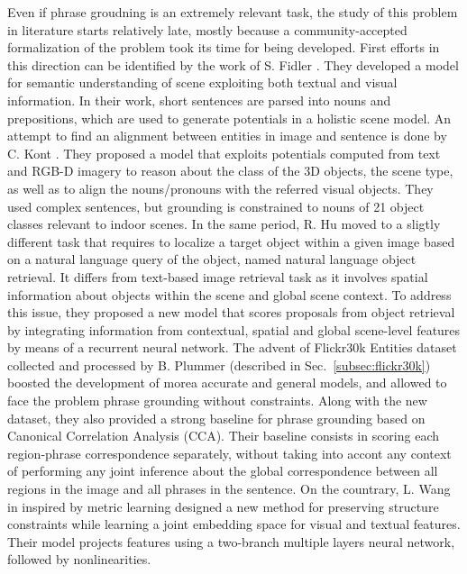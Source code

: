 Even if phrase groudning is an extremely relevant task, the study of
this problem in literature starts relatively late, mostly because a
community-accepted formalization of the problem took its time for
being developed. First efforts in this direction can be identified by
the work of S. Fidler \etal{} \cite{fidler2013sentence}. They
developed a model for semantic understanding of scene exploiting both
textual and visual information. In their work, short sentences are
parsed into nouns and prepositions, which are used to generate
potentials in a holistic scene model. An attempt to find an alignment
between entities in image and sentence is done by C. Kont \etal{}
\cite{kong2014you}. They proposed a model that exploits potentials
computed from text and RGB-D imagery to reason about the class of the
3D objects, the scene type, as well as to align the nouns/pronouns
with the referred visual objects. They used complex sentences, but
grounding is constrained to nouns of 21 object classes relevant to
indoor scenes. In the same period, R. Hu \etal{} \cite{hu2016natural}
moved to a sligtly different task that requires to localize a target
object within a given image based on a natural language query of the
object, named natural language object retrieval. It differs from
text-based image retrieval task as it involves spatial information
about objects within the scene and global scene context. To address
this issue, they proposed a new model that scores proposals from
object retrieval by integrating information from contextual, spatial
and global scene-level features by means of a recurrent neural
network. The advent of Flickr30k Entities dataset collected and
processed by B. Plummer \etal{} \cite{plummer2015flickr30k} (described
in Sec.~\ref{subsec:flickr30k}) boosted the development of morea
accurate and general models, and allowed to face the problem phrase
grounding without constraints. Along with the new dataset, they also
provided a strong baseline for phrase grounding based on Canonical
Correlation Analysis (CCA). Their baseline consists in scoring each
region-phrase correspondence separately, without taking into accont
any context of performing any joint inference about the global
correspondence between all regions in the image and all phrases in the
sentence. On the countrary, L. Wang \etal{} in \cite{wang2016learning}
inspired by metric learning designed a new method for preserving
structure constraints while learning a joint embedding space for
visual and textual features. Their model projects features using a
two-branch multiple layers neural network, followed by nonlinearities.
